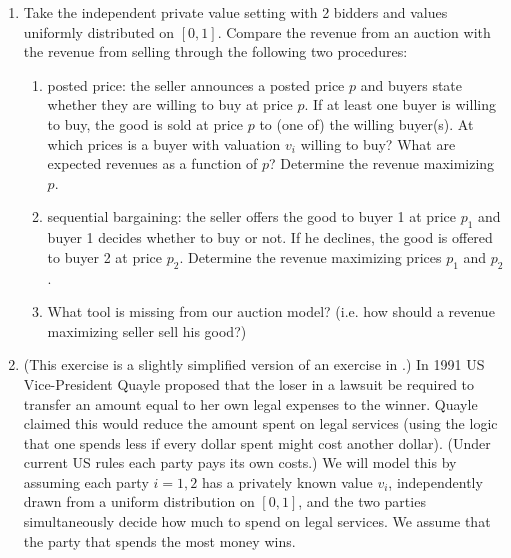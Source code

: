 \documentclass[a4paper,12pt]{article}
\begin{document}
\begin{enumerate}[resume]
\item Take the independent private value setting with 2 bidders and values uniformly distributed on $[0,1]$. Compare the revenue from an auction with the revenue from selling through the following two procedures:
  \begin{enumerate}
  \item posted price: the seller announces a posted price $p$ and buyers state whether they are willing to buy at price $p$. If at least one buyer is willing to buy, the good is sold at price $p$ to (one of) the willing buyer(s). At which prices is a buyer with valuation $v_i$ willing to buy? What are expected revenues as a function of $p$? Determine the revenue maximizing $p$.
  \item sequential bargaining: the seller offers the good to buyer 1 at price $p_1$ and buyer 1 decides whether to buy or not. If he declines, the good is offered to buyer 2 at price $p_2$. Determine the revenue maximizing prices $p_1$ and $p_2$.
  \item What tool is missing from our auction model? (i.e. how should a revenue maximizing seller sell his good?)
  \end{enumerate}
\item (This exercise is a slightly simplified version of an exercise in \cite{klemperer2004auctions}.) In 1991 US Vice-President Quayle proposed that the loser in a lawsuit be required to transfer an amount equal to her own legal expenses to the winner. Quayle claimed this would reduce the amount spent on legal services (using the logic that one spends less if every dollar spent might cost another dollar). (Under current US rules each party pays its own costs.) We will model this by assuming each party $i=1, 2$ has a privately known value $v_i$, independently drawn from a uniform distribution on $[0,1]$, and the two parties simultaneously decide how much to spend on legal services. We assume that the party that spends the most money wins.

\end{enumerate}
\end{document}
